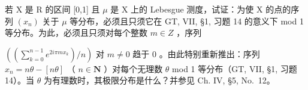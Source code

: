 若 X 是 R 的区间 {[}0,1{]} 且 \(\mu\) 是 X 上的 Lebesgue 测度，试证：为使 X 的点的序列 \((x_{n})\) 关于 \(\mu\) 等分布，必须且只须它在 GT, VII, §1, 习题 14 的意义下 mod 1 等分布。为此，必须且只须对每个整数 \(m \in Z\) ，序列

\(\left(\left(\sum_{k=0}^{n-1} e^{2i\pi mx_k}\right)/n\right)\) 对 \(m \neq 0\) 趋于 0 。由此特别重新推出：序列 \(x_{n} = n\theta - [n\theta]\) （ \(n \in \mathbf{N}\) ）对每个无理数 \(\theta\) mod 1 等分布（GT, VII, §1, 习题 14）。当 \(\theta\) 为有理数时，其极限分布是什么？并参见 Ch. IV, §5, No.~12。

\setcounter{exercisegroup}{3}
\edef\CurrentExerciseGroup{\arabic{exercisegroup}}
